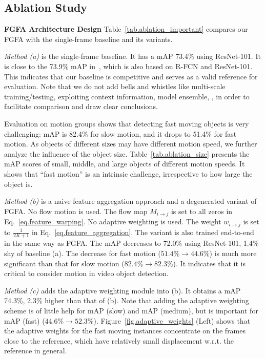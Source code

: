 \documentclass[10pt,twocolumn,letterpaper]{article}
\begin{document}
\subsection{Ablation Study}

\textbf{FGFA Architecture Design} Table~\ref{tab.ablation_important} compares our FGFA with the single-frame baseline and its variants.

\emph{Method (a)} is the single-frame baseline. It has a mAP 73.4\% using ResNet-101. It is close to the 73.9\% mAP in~\cite{zhu2016dff}, which is also based on R-FCN and ResNet-101. This indicates that our baseline is competitive and serves as a valid reference for evaluation. Note that we do not add bells and whistles like multi-scale training/testing, exploiting context information, model ensemble, \etc, in order to facilitate comparison and draw clear conclusions.

Evaluation on motion groups shows that detecting fast moving objects is very challenging: mAP is 82.4\% for slow motion, and it drops to 51.4\% for fast motion. As objects of different sizes may have different motion speed, we further analyze the influence of the object size. Table~\ref{tab.ablation_size} presents the mAP scores of small, middle, and large objects of different motion speeds. It shows that ``fast motion'' is an intrinsic challenge, irrespective to how large the object is.

\emph{Method (b)} is a naive feature aggregation approach and a degenerated variant of FGFA. No flow motion is used. The flow map $M_{i \rightarrow j}$ is set to all zeros in Eq.~\eqref{eq.feature_warping}. No adaptive weighting is used. The weight $w_{i \rightarrow j}$ is set to $\frac{1}{2K+1}$ in Eq.~\eqref{eq.feature_aggregation}. The variant is also trained end-to-end in the same way as FGFA. The mAP decreases to 72.0\% using ResNet-101, 1.4\% shy of baseline (a). The decrease for fast motion ($51.4\% \rightarrow 44.6\%$) is much more significant than that for slow motion ($82.4\% \rightarrow 82.3\%$). It indicates that it is critical to consider motion in video object detection.

\emph{Method (c)} adds the adaptive weighting module into (b). It obtains a mAP 74.3\%, 2.3\% higher than that of (b). Note that adding the adaptive weighting scheme is of little help for mAP (slow) and mAP (medium), but is important for mAP (fast) ($44.6\% \rightarrow 52.3\%$). Figure~\ref{fig.adaptive_weights} (Left) shows that the adaptive weights for the fast moving instances  concentrate on the frames close to the reference, which have relatively small displacement w.r.t. the reference in general.
\end{document}
